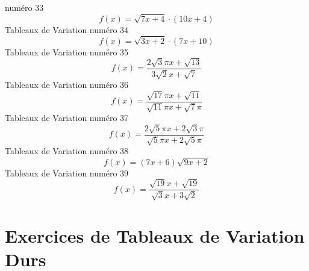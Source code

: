 \documentclass{article}
\begin{document}
num\'ero 33 \[f(x) = \sqrt{7 x + 4} \cdot \left(10 x + 4\right)\]Tableaux de Variation num\'ero 34 \[f(x) = \sqrt{3 x + 2} \cdot \left(7 x + 10\right)\]Tableaux de Variation num\'ero 35 \[f(x) = \frac{2 \sqrt{3} \pi x + \sqrt{13}}{3 \sqrt{2} x + \sqrt{7}}\]Tableaux de Variation num\'ero 36 \[f(x) = \frac{\sqrt{17} \pi x + \sqrt{11}}{\sqrt{11} \pi x + \sqrt{7} \pi}\]Tableaux de Variation num\'ero 37 \[f(x) = \frac{2 \sqrt{5} \pi x + 2 \sqrt{3} \pi}{\sqrt{5} \pi x + 2 \sqrt{5} \pi}\]Tableaux de Variation num\'ero 38 \[f(x) = \left(7 x + 6\right) \sqrt{9 x + 2}\]Tableaux de Variation num\'ero 39 \[f(x) = \frac{\sqrt{19} x + \sqrt{19}}{\sqrt{3} x + 3 \sqrt{2}}\]
 \section{Exercices de Tableaux de Variation Durs}
\end{document}
